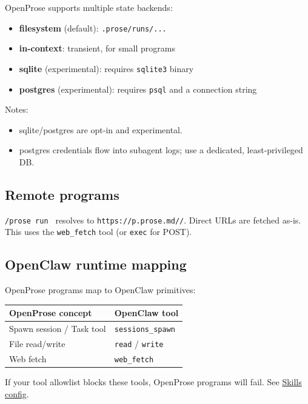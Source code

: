 OpenProse supports multiple state backends:

\begin{itemize}
  \item \textbf{filesystem} (default): \texttt{.prose/runs/...}
  \item \textbf{in-context}: transient, for small programs
  \item \textbf{sqlite} (experimental): requires \texttt{sqlite3} binary
  \item \textbf{postgres} (experimental): requires \texttt{psql} and a connection string
\end{itemize}


Notes:

\begin{itemize}
  \item sqlite/postgres are opt-in and experimental.
  \item postgres credentials flow into subagent logs; use a dedicated, least-privileged DB.
\end{itemize}


\subsection{Remote programs}


\texttt{/prose run } resolves to \texttt{https://p.prose.md//}.
Direct URLs are fetched as-is. This uses the \texttt{web\_fetch} tool (or \texttt{exec} for POST).

\subsection{OpenClaw runtime mapping}


OpenProse programs map to OpenClaw primitives:


\begin{table}[h]
\centering
\small
\begin{tabular}{|l|l|}
\hline
OpenProse concept & OpenClaw tool \\
\hline
Spawn session / Task tool & \texttt{sessions\_spawn} \\
\hline
File read/write & \texttt{read} / \texttt{write} \\
\hline
Web fetch & \texttt{web\_fetch} \\
\hline
\end{tabular}
\end{table}



If your tool allowlist blocks these tools, OpenProse programs will fail. See \href{/tools/skills-config}{Skills config}.

